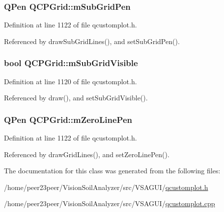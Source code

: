 \subsubsection[{m\+Sub\+Grid\+Pen}]{\setlength{\rightskip}{0pt plus 5cm}Q\+Pen Q\+C\+P\+Grid\+::m\+Sub\+Grid\+Pen\hspace{0.3cm}{\ttfamily [protected]}}\label{class_q_c_p_grid_aa9004bc139ad3ea92629f0aaae81d83f}


Definition at line 1122 of file qcustomplot.\+h.



Referenced by draw\+Sub\+Grid\+Lines(), and set\+Sub\+Grid\+Pen().

\hypertarget{class_q_c_p_grid_a4e4a0400d6319bb44c06341f6298c87b}{}
\subsubsection[{m\+Sub\+Grid\+Visible}]{\setlength{\rightskip}{0pt plus 5cm}bool Q\+C\+P\+Grid\+::m\+Sub\+Grid\+Visible\hspace{0.3cm}{\ttfamily [protected]}}\label{class_q_c_p_grid_a4e4a0400d6319bb44c06341f6298c87b}


Definition at line 1120 of file qcustomplot.\+h.



Referenced by draw(), and set\+Sub\+Grid\+Visible().

\hypertarget{class_q_c_p_grid_a379481871f17655c27eda30af233554f}{}
\subsubsection[{m\+Zero\+Line\+Pen}]{\setlength{\rightskip}{0pt plus 5cm}Q\+Pen Q\+C\+P\+Grid\+::m\+Zero\+Line\+Pen\hspace{0.3cm}{\ttfamily [protected]}}\label{class_q_c_p_grid_a379481871f17655c27eda30af233554f}


Definition at line 1122 of file qcustomplot.\+h.



Referenced by draw\+Grid\+Lines(), and set\+Zero\+Line\+Pen().



The documentation for this class was generated from the following files\+:\begin{DoxyCompactItemize}
\item 
/home/peer23peer/\+Vision\+Soil\+Analyzer/src/\+V\+S\+A\+G\+U\+I/\hyperlink{qcustomplot_8h}{qcustomplot.\+h}\item 
/home/peer23peer/\+Vision\+Soil\+Analyzer/src/\+V\+S\+A\+G\+U\+I/\hyperlink{qcustomplot_8cpp}{qcustomplot.\+cpp}\end{DoxyCompactItemize}
